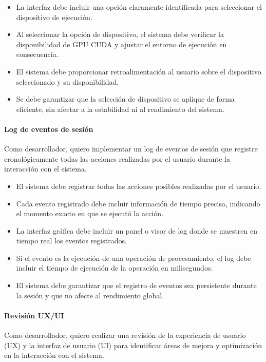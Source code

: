 \begin{itemize}[noitemsep]
	\item La interfaz debe incluir una opción claramente identificada para seleccionar el dispositivo de ejecución.
	\item Al seleccionar la opción de dispositivo, el sistema debe verificar la disponibilidad de GPU CUDA y ajustar el entorno de ejecución en consecuencia.
	\item El sistema debe proporcionar retroalimentación al usuario sobre el dispositivo seleccionado y su disponibilidad.
	\item Se debe garantizar que la selección de dispositivo se aplique de forma eficiente, sin afectar a la estabilidad ni al rendimiento del sistema.
\end{itemize}

\newpage

\paragraph{Log de eventos de sesión} \label{hist:log_eventos_sesion}
Como desarrollador, quiero implementar un log de eventos de sesión que registre cronológicamente todas 
las acciones realizadas por el usuario durante la interacción con el sistema.

\begin{itemize}[noitemsep]
    \item El sistema debe registrar todas las acciones posibles realizadas por el usuario.
    \item Cada evento registrado debe incluir información de tiempo precisa, indicando el momento exacto en que se ejecutó la acción.
    \item La interfaz gráfica debe incluir un panel o visor de log donde se muestren en tiempo real los eventos registrados.
    \item Si el evento es la ejecución de una operación de procesamiento, el log debe incluir el tiempo de ejecución de la operación en milisegundos.
    \item El sistema debe garantizar que el registro de eventos sea persistente durante la sesión y que no afecte al rendimiento global.
\end{itemize}

\paragraph{Revisión UX/UI} \label{hist:revision_ux_ui}
Como desarrollador, quiero realizar una revisión de la experiencia de usuario (UX) y la interfaz
de usuario (UI) para identificar áreas de mejora y optimización en la interacción con el sistema.

